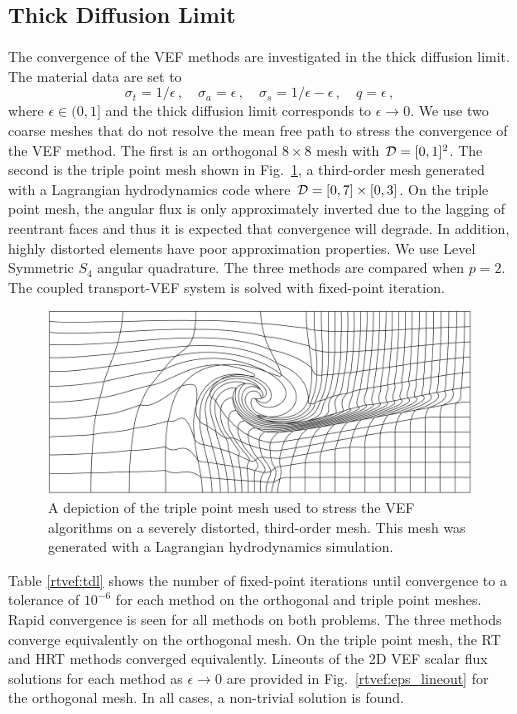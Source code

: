 \documentclass[../doc.tex]{subfiles}
\begin{document}
\subsection{Thick Diffusion Limit}
The convergence of the VEF methods are investigated in the thick diffusion limit. The material data are set to 
	\begin{equation}
		\sigma_t = 1/\epsilon \,, \quad \sigma_a = \epsilon \,, \quad \sigma_s = 1/\epsilon - \epsilon \,, \quad q = \epsilon \,, 
	\end{equation}
where $\epsilon \in (0,1]$ and the thick diffusion limit corresponds to $\epsilon \rightarrow 0$. We use two coarse meshes that do not resolve the mean free path to stress the convergence of the VEF method. The first is an orthogonal $8\times 8$ mesh with $\mathcal{D} = [0,1]^2$. The second is the triple point mesh shown in Fig.~\ref{rtvef:triple_point_mesh}, a third-order mesh generated with a Lagrangian hydrodynamics code where $\mathcal{D} = [0,7]\times [0,3]$. On the triple point mesh, the angular flux is only approximately inverted due to the lagging of reentrant faces and thus it is expected that convergence will degrade. In addition, highly distorted elements have poor approximation properties. We use Level Symmetric $S_4$ angular quadrature. The three methods are compared when $p=2$. The coupled transport-VEF system is solved with fixed-point iteration. 
\begin{figure}
\centering
\includegraphics[width=.65\textwidth]{data/img/3point.png}
\caption{A depiction of the triple point mesh used to stress the VEF algorithms on a severely distorted, third-order mesh. This mesh was generated with a Lagrangian hydrodynamics simulation. }
\label{rtvef:triple_point_mesh}
\end{figure}

Table \ref{rtvef:tdl} shows the number of fixed-point iterations until convergence to a tolerance of $10^{-6}$ for each method on the orthogonal and triple point meshes. Rapid convergence is seen for all methods on both problems. The three methods converge equivalently on the orthogonal mesh. On the triple point mesh, the RT and HRT methods converged equivalently. Lineouts of the 2D VEF scalar flux solutions for each method as $\epsilon \rightarrow 0$ are provided in Fig.~\ref{rtvef:eps_lineout} for the orthogonal mesh. In all cases, a non-trivial solution is found. 
\end{document}
